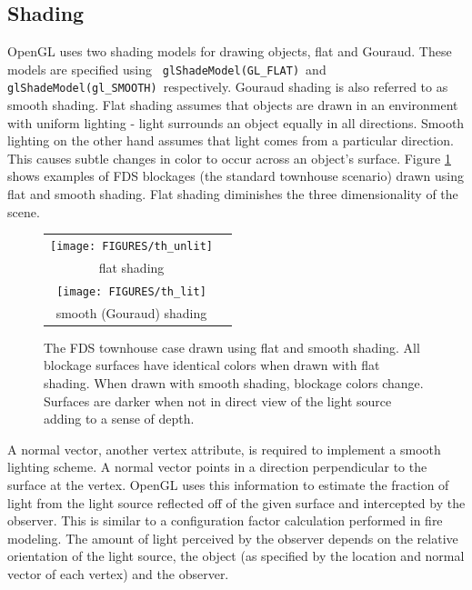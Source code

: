 \documentclass[11pt,twoside]{book}
\newcommand{\figoptions}{htp}
\begin{document}
\subsection{Shading} OpenGL uses two shading models for drawing
objects, flat and Gouraud.  These models are specified using {\tt
glShadeModel(GL\_FLAT)}\ and {\tt glShadeModel(gl\_SMOOTH)}\
respectively. Gouraud shading is also referred to as smooth
shading.  Flat shading assumes that objects are drawn in an
environment with uniform lighting - light surrounds an object
equally in all directions. Smooth lighting on the other hand
assumes that light comes from a particular direction.  This causes
subtle changes in color to occur across an object's surface.
Figure \ref{figlighting} shows examples of FDS blockages (the
standard townhouse scenario) drawn using flat and smooth shading.
Flat shading diminishes the three dimensionality of the scene.
\begin{figure}[\figoptions]
\begin{center}
\begin{tabular}{cc}
\texttt{[image: FIGURES/th\_unlit]}\\
flat shading\\
\texttt{[image: FIGURES/th\_lit]}\\
smooth (Gouraud) shading\\
\end{tabular}
\end{center}
\caption [The FDS townhouse case drawn using flat and smooth
shading.] { The FDS townhouse case drawn using flat and smooth
shading. All blockage surfaces have identical colors when drawn
with flat shading.  When drawn with smooth shading, blockage
colors change.  Surfaces are darker when not in direct view of the
light source adding to a sense of depth. } \label{figlighting}
\end{figure}

A normal vector, another vertex attribute, is required to
implement a smooth lighting scheme. A normal vector points in a
direction perpendicular to the surface at the vertex. OpenGL uses
this information to estimate the fraction of light from the light
source reflected off of the given surface and intercepted by the
observer.  This is similar to a configuration factor calculation
performed in fire modeling.  The amount of light perceived by the
observer depends on the relative orientation of the light source,
the object (as specified by the location and normal vector of each
vertex) and the observer.
\end{document}
